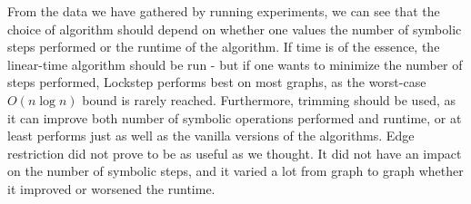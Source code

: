 \documentclass[../master/master.tex]{subfiles}
\begin{document}
From the data we have gathered by running experiments, we can see that the choice of algorithm should depend on whether one values the number of symbolic steps performed or the runtime of the algorithm. If time is of the essence, the linear-time algorithm should be run - but if one wants to minimize the number of steps performed, Lockstep performs best on most graphs, as the worst-case $O(n\log n)$ bound is rarely reached. Furthermore, trimming should be used, as it can improve both number of symbolic operations performed and runtime, or at least performs just as well as the vanilla versions of the algorithms. Edge restriction did not prove to be as useful as we thought. It did not have an impact on the number of symbolic steps, and it varied a lot from graph to graph whether it improved or worsened the runtime.

\end{document}
